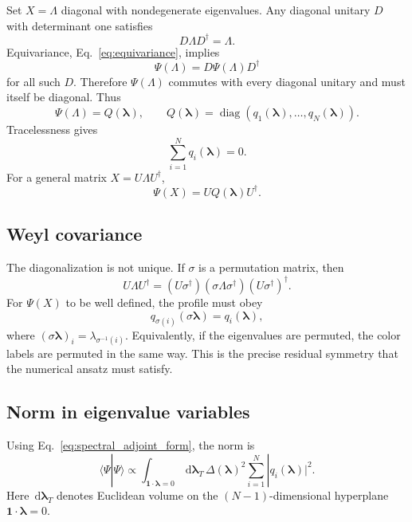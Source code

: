 \documentclass[11pt]{article}
\newcommand{\diag}{\operatorname{diag}}
\newcommand{\dd}{\,\mathrm d}
\begin{document}
Set $X=\Lambda$ diagonal with nondegenerate eigenvalues.  Any diagonal unitary $D$ with determinant one satisfies
\begin{equation}
D\Lambda D^\dagger=\Lambda.
\end{equation}
Equivariance, Eq.~\eqref{eq:equivariance}, implies
\begin{equation}
\Psi(\Lambda)=D\Psi(\Lambda)D^\dagger
\end{equation}
for all such $D$.  Therefore $\Psi(\Lambda)$ commutes with every diagonal unitary and must itself be diagonal.  Thus
\begin{equation}
\Psi(\Lambda)=Q(\bm\lambda),
\qquad
Q(\bm\lambda)=\diag(q_1(\bm\lambda),\ldots,q_N(\bm\lambda)).
\end{equation}
Tracelessness gives
\begin{equation}
\boxed{
\sum_{i=1}^N q_i(\bm\lambda)=0.
}
\label{eq:traceless_q}
\end{equation}
For a general matrix $X=U\Lambda U^\dagger$,
\begin{equation}
\boxed{
\Psi(X)=UQ(\bm\lambda)U^\dagger.
}
\label{eq:spectral_adjoint_form}
\end{equation}

\subsection{Weyl covariance}

The diagonalization is not unique.  If $\sigma$ is a permutation matrix, then
\begin{equation}
U\Lambda U^\dagger=(U\sigma^\dagger)(\sigma\Lambda\sigma^\dagger)(U\sigma^\dagger)^\dagger.
\end{equation}
For $\Psi(X)$ to be well defined, the profile must obey
\begin{equation}
\boxed{
q_{\sigma(i)}(\sigma\bm\lambda)=q_i(\bm\lambda),
}
\label{eq:weyl_covariance}
\end{equation}
where $(\sigma\bm\lambda)_i=\lambda_{\sigma^{-1}(i)}$.
Equivalently, if the eigenvalues are permuted, the color labels are permuted in the same way.  This is the precise residual symmetry that the numerical ansatz must satisfy.

\subsection{Norm in eigenvalue variables}

Using Eq.~\eqref{eq:spectral_adjoint_form}, the norm is
\begin{equation}
\langle \Psi|\Psi\rangle
\propto
\int_{\bm 1\cdot\bm\lambda=0}\dd\bm\lambda_T\,
\Delta(\bm\lambda)^2
\sum_{i=1}^N |q_i(\bm\lambda)|^2.
\end{equation}
Here $\dd\bm\lambda_T$ denotes Euclidean volume on the $(N-1)$-dimensional hyperplane $\bm 1\cdot\bm\lambda=0$.
\end{document}
